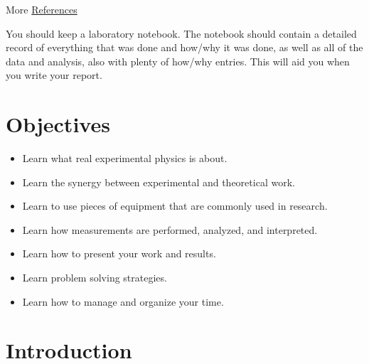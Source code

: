 \documentclass{../lab}
\begin{document}
\noindent More \hyperref[sec:References]{References}

You should keep a laboratory notebook. The notebook should contain a detailed record of everything that was done and how/why it was done, as well as all of the data and analysis, also with plenty of how/why entries. This will aid you when you write your report.

\section{Objectives}

\begin{itemize}
    \item Learn what real experimental physics is about.

    \item Learn the synergy between experimental and theoretical work.

    \item Learn to use pieces of equipment that are commonly used in research.

    \item Learn how measurements are performed, analyzed, and interpreted.

    \item Learn how to present your work and results.

    \item Learn problem solving strategies.

    \item Learn how to manage and organize your time.
\end{itemize}

\section{Introduction}
\end{document}
